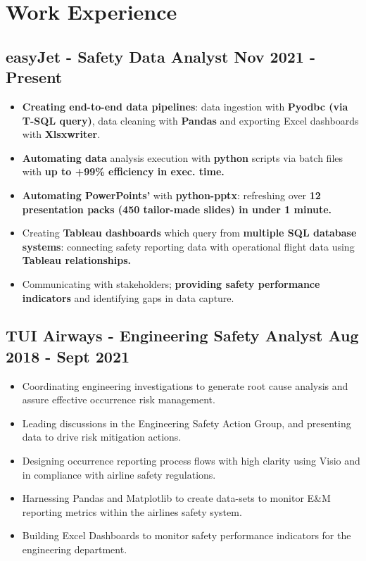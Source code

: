 \documentclass[a4paper,9pt]{article}
\begin{document}
\section*{Work Experience}
\subsection*{\textbf{easyJet - Safety Data Analyst} \hfill  Nov 2021 - Present}
\begin{itemize}[noitemsep]
	\item \textbf{Creating end-to-end data pipelines}: data ingestion with \textbf{Pyodbc (via T-SQL query)}, data cleaning with \textbf{Pandas} and exporting Excel dashboards with \textbf{Xlsxwriter}.
	\item \textbf{Automating data} analysis execution with \textbf{python} scripts via batch files with \textbf{up to +99\% efficiency in exec. time.}
	\item \textbf{Automating PowerPoints'} with \textbf{python-pptx}: refreshing over \textbf{12 presentation packs (450 tailor-made slides) in under 1 minute.}

	\item Creating \textbf{Tableau dashboards} which query from \textbf{multiple SQL database systems}: connecting safety reporting data with operational flight data using \textbf{Tableau relationships.}
	\item Communicating with stakeholders; \textbf{providing safety performance indicators} and identifying gaps in data capture.


\end{itemize}

\subsection*{\textbf{TUI Airways - Engineering Safety Analyst} \hfill  Aug 2018 - Sept 2021}
\begin{itemize}[noitemsep]
	\item Coordinating engineering investigations to generate root cause analysis and assure effective occurrence risk management.
	\item Leading discussions in the Engineering Safety Action Group, and presenting data to drive risk mitigation actions.
	\item Designing occurrence reporting process flows with high clarity using Visio and in compliance with airline safety regulations.
	\item Harnessing Pandas and Matplotlib to create data-sets to monitor E\&M reporting metrics within the airlines safety system.
	\item Building Excel Dashboards to monitor safety performance indicators for the engineering department.
\end{itemize}
\end{document}
